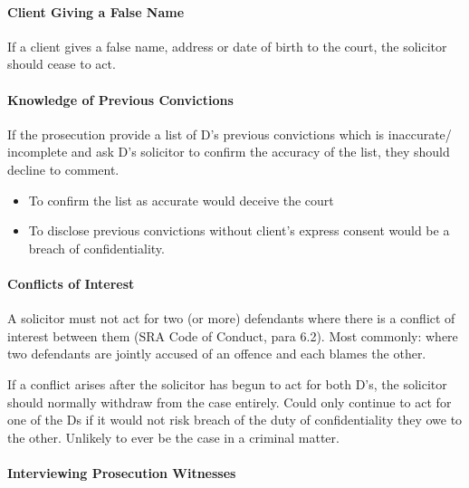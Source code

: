 \documentclass[
]{article}
\providecommand{\tightlist}{%
  \setlength{\itemsep}{0pt}\setlength{\parskip}{0pt}}
\begin{document}
\hypertarget{client-giving-a-false-name}{%
\paragraph{Client Giving a False
Name}\label{client-giving-a-false-name}}

If a client gives a false name, address or date of birth to the court,
the solicitor should cease to act.

\hypertarget{knowledge-of-previous-convictions}{%
\paragraph{Knowledge of Previous
Convictions}\label{knowledge-of-previous-convictions}}

If the prosecution provide a list of D's previous convictions which is
inaccurate/ incomplete and ask D's solicitor to confirm the accuracy of
the list, they should decline to comment.

\begin{itemize}
\tightlist
\item
  To confirm the list as accurate would deceive the court
\item
  To disclose previous convictions without client's express consent
  would be a breach of confidentiality.
\end{itemize}

\hypertarget{conflicts-of-interest}{%
\paragraph{Conflicts of Interest}\label{conflicts-of-interest}}

A solicitor must not act for two (or more) defendants where there is a
conflict of interest between them (SRA Code of Conduct, para 6.2). Most
commonly: where two defendants are jointly accused of an offence and
each blames the other.

If a conflict arises after the solicitor has begun to act for both D's,
the solicitor should normally withdraw from the case entirely. Could
only continue to act for one of the Ds if it would not risk breach of
the duty of confidentiality they owe to the other. Unlikely to ever be
the case in a criminal matter.

\hypertarget{interviewing-prosecution-witnesses}{%
\paragraph{Interviewing Prosecution
Witnesses}\label{interviewing-prosecution-witnesses}}
\end{document}
